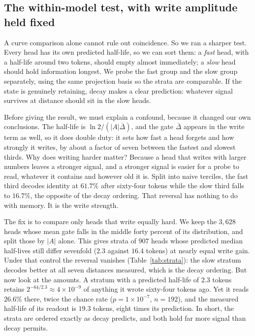 \documentclass{article}
\begin{document}
\subsection{The within-model test, with write amplitude held fixed}
\label{sec:strata}

A curve comparison alone cannot rule out coincidence. So we ran a sharper
test. Every head has its own predicted half-life, so we can sort them: a
\emph{fast} head, with a half-life around two tokens, should empty almost
immediately; a \emph{slow} head should hold information longest. We probe the
fast group and the slow group separately, using the same projection basis so
the strata are comparable. If the state is genuinely retaining, decay makes a
clear prediction: whatever signal survives at distance should sit in the slow
heads.

Before giving the result, we must explain a confound, because it changed our
own conclusions. The half-life is $\ln 2/(|A|\bar{\Delta})$, and the gate
$\bar{\Delta}$ appears in the write term as well, so it does double duty: it
sets how fast a head forgets and how strongly it writes, by about a factor of
seven between the fastest and slowest thirds. Why does writing harder matter?
Because a head that writes with larger numbers leaves a stronger signal, and
a stronger signal is easier for a probe to read, whatever it contains and
however old it is. Split into naive terciles, the fast third decodes identity
at $61.7\%$ after sixty-four tokens while the slow third falls to $16.7\%$,
the opposite of the decay ordering. That reversal has nothing to do with
memory. It is the write strength.

The fix is to compare only heads that write equally hard. We keep the
$3{,}628$ heads whose mean gate falls in the middle forty percent of its
distribution, and split those by $|A|$ alone. This gives strata of $907$
heads whose predicted median half-lives still differ sevenfold ($2.3$ against
$16.4$ tokens) at nearly equal write gain. Under that control the reversal vanishes
(Table~\ref{tab:strata}): the slow stratum decodes better at all seven
distances measured, which is the decay ordering. But now look at the amounts.
A stratum with a predicted half-life of $2.3$ tokens retains
$2^{-64/2.3} \approx 4\times10^{-9}$ of anything it wrote sixty-four tokens
ago. Yet it reads $26.6\%$ there, twice the chance rate ($p = 1\times10^{-7}$,
$n = 192$), and the measured half-life of its readout is $19.3$ tokens, eight
times its prediction. In short, the strata are ordered exactly as decay
predicts, and both hold far more signal than decay permits.
\end{document}
